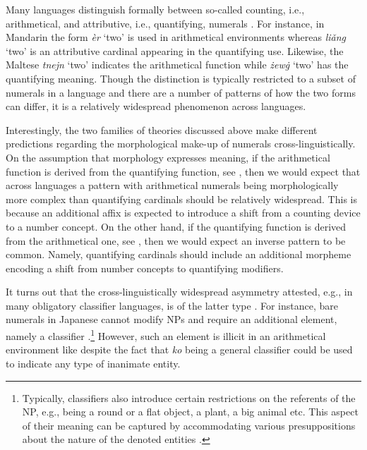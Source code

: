 \documentclass[output=paper]{langscibook}
\begin{document}
	Many languages distinguish formally between so-called counting, i.e., arithmetical, and attributive, i.e., quantifying, numerals \citep{hurford1998interaction,hurford2001languages}. For instance, in Mandarin the form \textit{èr} `two' is used in arithmetical environments whereas \textit{liǎng} `two' is an attributive cardinal appearing in the quantifying use. Likewise, the Maltese \textit{tnejn} `two' indicates the arithmetical function while \textit{żewġ} `two' has the quantifying meaning. Though the distinction is typically restricted to a subset of numerals in a language and there are a number of patterns of how the two forms can differ, it is a relatively widespread phenomenon across languages.
	
	Interestingly, the two families of theories discussed above make different predictions regarding the morphological make-up of numerals cross-\-lin\-guistically. On the assumption that morphology expresses meaning, if the arithmetical function is derived from the quantifying function, see , then we would expect that across languages a pattern with arithmetical numerals being morphologically more complex than quantifying cardinals should be relatively widespread. This is because an additional affix is expected to introduce a shift from a counting device to a number concept. On the other hand, if the quantifying function is derived from the arithmetical one, see , then we would expect an inverse pattern to be common. Namely, quantifying cardinals should include an additional morpheme encoding a shift from number concepts to quantifying modifiers.
	
	It turns out that the cross-linguistically widespread asymmetry attested, e.g., in many obligatory classifier languages, is of the latter type \citep{wagiel_caha2020universal,wagiel2023grammatical}.	For instance, bare numerals in Japanese cannot modify NPs and require an additional element, namely a classifier .\footnote{Typically, classifiers also introduce certain restrictions on the referents of the NP, e.g., being a round or a flat object, a plant, a big animal etc. This aspect of their meaning can be captured by accommodating various presuppositions about the nature of the denoted  entities \citep{sudo2016semantic}.} However, such an element is illicit in an arithmetical environment like  despite the fact that \textit{ko} being a general classifier could be used to indicate any type of inanimate entity.
\end{document}
